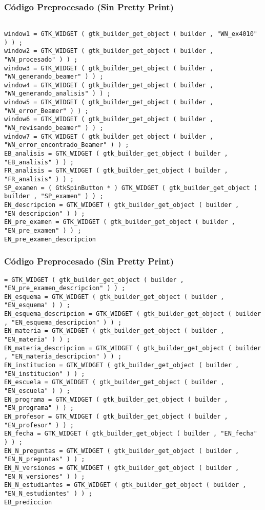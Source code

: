 \documentclass{beamer}
\begin{document}
\begin{frame}[fragile]
\frametitle{C\'odigo Preprocesado (Sin Pretty Print)}
\begin{lstlisting}[style=CStyle]

window1 = GTK_WIDGET ( gtk_builder_get_object ( builder , "WN_ex4010" ) ) ; 
window2 = GTK_WIDGET ( gtk_builder_get_object ( builder , "WN_procesado" ) ) ; 
window3 = GTK_WIDGET ( gtk_builder_get_object ( builder , "WN_generando_beamer" ) ) ; 
window4 = GTK_WIDGET ( gtk_builder_get_object ( builder , "WN_generando_analisis" ) ) ; 
window5 = GTK_WIDGET ( gtk_builder_get_object ( builder , "WN_error_Beamer" ) ) ; 
window6 = GTK_WIDGET ( gtk_builder_get_object ( builder , "WN_revisando_beamer" ) ) ; 
window7 = GTK_WIDGET ( gtk_builder_get_object ( builder , "WN_error_encontrado_Beamer" ) ) ; 
EB_analisis = GTK_WIDGET ( gtk_builder_get_object ( builder , "EB_analisis" ) ) ; 
FR_analisis = GTK_WIDGET ( gtk_builder_get_object ( builder , "FR_analisis" ) ) ; 
SP_examen = ( GtkSpinButton * ) GTK_WIDGET ( gtk_builder_get_object ( builder , "SP_examen" ) ) ; 
EN_descripcion = GTK_WIDGET ( gtk_builder_get_object ( builder , "EN_descripcion" ) ) ; 
EN_pre_examen = GTK_WIDGET ( gtk_builder_get_object ( builder , "EN_pre_examen" ) ) ; 
EN_pre_examen_descripcion \end{lstlisting}
\end{frame}
\begin{frame}[fragile]
\frametitle{C\'odigo Preprocesado (Sin Pretty Print)}
\begin{lstlisting}[style=CStyle]
= GTK_WIDGET ( gtk_builder_get_object ( builder , "EN_pre_examen_descripcion" ) ) ; 
EN_esquema = GTK_WIDGET ( gtk_builder_get_object ( builder , "EN_esquema" ) ) ; 
EN_esquema_descripcion = GTK_WIDGET ( gtk_builder_get_object ( builder , "EN_esquema_descripcion" ) ) ; 
EN_materia = GTK_WIDGET ( gtk_builder_get_object ( builder , "EN_materia" ) ) ; 
EN_materia_descripcion = GTK_WIDGET ( gtk_builder_get_object ( builder , "EN_materia_descripcion" ) ) ; 
EN_institucion = GTK_WIDGET ( gtk_builder_get_object ( builder , "EN_institucion" ) ) ; 
EN_escuela = GTK_WIDGET ( gtk_builder_get_object ( builder , "EN_escuela" ) ) ; 
EN_programa = GTK_WIDGET ( gtk_builder_get_object ( builder , "EN_programa" ) ) ; 
EN_profesor = GTK_WIDGET ( gtk_builder_get_object ( builder , "EN_profesor" ) ) ; 
EN_fecha = GTK_WIDGET ( gtk_builder_get_object ( builder , "EN_fecha" ) ) ; 
EN_N_preguntas = GTK_WIDGET ( gtk_builder_get_object ( builder , "EN_N_preguntas" ) ) ; 
EN_N_versiones = GTK_WIDGET ( gtk_builder_get_object ( builder , "EN_N_versiones" ) ) ; 
EN_N_estudiantes = GTK_WIDGET ( gtk_builder_get_object ( builder , "EN_N_estudiantes" ) ) ; 
EB_prediccion \end{lstlisting}
\end{frame}
\end{document}
